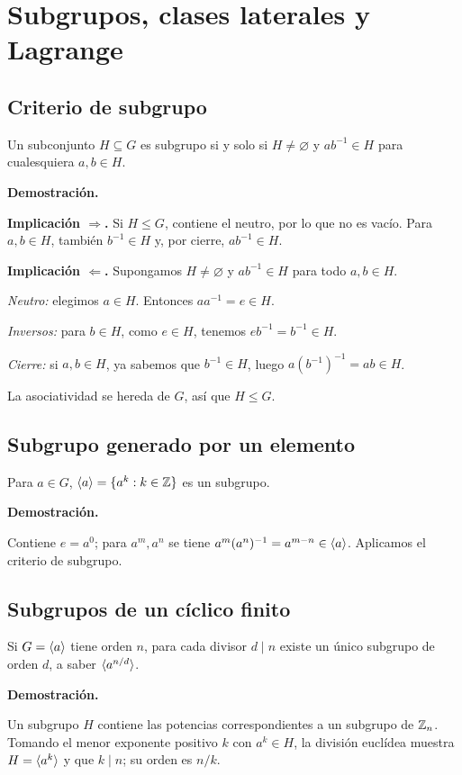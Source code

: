 \documentclass[11pt,a4paper]{article}
\begin{document}
\section{Subgrupos, clases laterales y Lagrange}

\subsection{Criterio de subgrupo}
\begin{resultado}
Un subconjunto $H\subseteq G$ es subgrupo si y solo si $H\ne\varnothing$ y $ab^{-1}\in H$ para cualesquiera $a,b\in H$.
\end{resultado}
\textbf{Demostración.}
\begin{demostracion}
\textbf{Implicación $\Rightarrow$.} Si $H\le G$, contiene el neutro, por lo que no es vacío. Para $a,b\in H$, también $b^{-1}\in H$ y, por cierre, $ab^{-1}\in H$.

\textbf{Implicación $\Leftarrow$.} Supongamos $H\ne\varnothing$ y $ab^{-1}\in H$ para todo $a,b\in H$.

\emph{Neutro:} elegimos $a\in H$. Entonces $aa^{-1}=e\in H$.

\emph{Inversos:} para $b\in H$, como $e\in H$, tenemos $eb^{-1}=b^{-1}\in H$.

\emph{Cierre:} si $a,b\in H$, ya sabemos que $b^{-1}\in H$, luego $a(b^{-1})^{-1}=ab\in H$.

La asociatividad se hereda de $G$, así que $H\le G$.
\end{demostracion}


\subsection{Subgrupo generado por un elemento}
\begin{resultado}
Para $a\in G$, $\langle a\rangle=\{a^k:k\in\mathbb{Z}\}$ es un subgrupo.
\end{resultado}
\textbf{Demostración.}
\begin{demostracion}
Contiene $e=a^0$; para $a^m,a^n$ se tiene $a^m(a^n)^{-1}=a^{m-n}\in\langle a\rangle$. Aplicamos el criterio de subgrupo.
\end{demostracion}


\subsection{Subgrupos de un cíclico finito}
\begin{resultado}
Si $G=\langle a\rangle$ tiene orden $n$, para cada divisor $d\mid n$ existe un único subgrupo de orden $d$, a saber $\langle a^{n/d}\rangle$.
\end{resultado}
\textbf{Demostración.}
\begin{demostracion}
Un subgrupo $H$ contiene las potencias correspondientes a un subgrupo de $\mathbb{Z}_n$. Tomando el menor exponente positivo $k$ con $a^k\in H$, la división euclídea muestra $H=\langle a^k\rangle$ y que $k\mid n$; su orden es $n/k$.
\end{demostracion}
\end{document}
